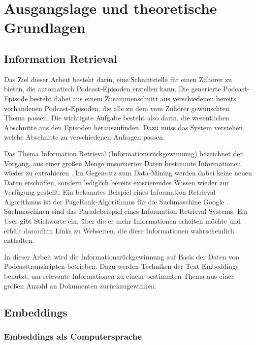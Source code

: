 \chapter{Ausgangslage und theoretische Grundlagen}\label{ch:theoretical}

\section{Information Retrieval}

Das Ziel dieser Arbeit besteht darin, eine Schnittstelle für einen Zuhörer zu bieten, die automatisch Podcast-Episoden erstellen kann. 
Die generierte Podcast-Episode besteht dabei aus einem Zusammenschnitt aus verschiedenen bereits vorhandenen Podcast-Episoden, die alle zu dem vom Zuhörer gewünschten Thema passen.
Die wichtigste Aufgabe besteht also darin, die wesentlichen Abschnitte aus den Episoden herauszufinden.
Dazu muss das System verstehen, welche Abschnitte zu verschiedenen Anfragen passen.

Das Thema Information Retrieval (Informationsrückgewinnung) bezeichnet den Vorgang, aus einer großen Menge unsortierter Daten bestimmte Informationen wieder zu extrahieren \cite{chowdhury2010}.
Im Gegensatz zum Data-Mining werden dabei keine neuen Daten erschaffen, sondern lediglich bereits existierendes Wissen wieder zur Verfügung gestellt.
Ein bekanntes Beispiel eines Information Retrieval Algorithmus ist der PageRank-Algorithmus für die Suchmaschine Google \cite{page}.
Suchmaschinen sind das Paradebeispiel eines Information Retrieval Systems.
Ein User gibt Stichworte ein, über die er mehr Informationen erhalten möchte und erhält daraufhin Links zu Webseiten, die diese Informationen wahrscheinlich enthalten.

In dieser Arbeit wird die Informationsrückgewinnung auf Basis der Daten von Podcasttranskripten betrieben.
Dazu werden Techniken der Text Embeddings benutzt, um relevante Informationen zu einem bestimmten Thema aus einer großen Anzahl an Dokumenten zurückzugewinnen.

\section{Embeddings}

\subsection{Embeddings als Computersprache}

